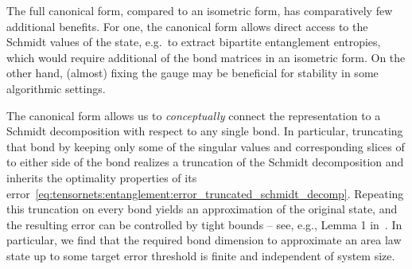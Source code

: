 The full canonical form, compared to an isometric form, has comparatively few additional benefits.
%
For one, the canonical form allows direct access to the Schmidt values of the state, e.g.~to extract bipartite entanglement entropies, which would require additional  of the bond matrices in an isometric form.
%
On the other hand, (almost) fixing the gauge may be beneficial for stability in some algorithmic settings.

The canonical form allows us to \emph{conceptually} connect the  representation to a Schmidt decomposition with respect to any single bond.
%
In particular, truncating that bond by keeping only some of the singular values and corresponding slices of  to either side of the bond realizes a truncation of the Schmidt decomposition and inherits the optimality properties of its error~\eqref{eq:tensornets:entanglement:error_truncated_schmidt_decomp}.
%
Repeating this truncation on every bond yields an  approximation of the original state, and the resulting error can be controlled by tight bounds -- see, e.g., Lemma 1 in~\cite{verstraete2006}.
%
In particular, we find that the required bond dimension to approximate an area law state up to some target error threshold is finite and independent of system size.

